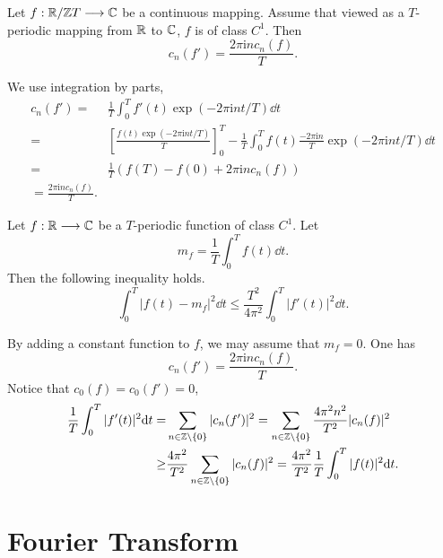 \begin{propositionenv}
    Let $f : \mathbb{R} /\mathbb{Z} T \longrightarrow \mathbb{C}$ be a continuous mapping.
    Assume that viewed as a $T$-periodic mapping from $\mathbb{R}$ to $\mathbb{C}$, $f$ is of class $C^1$.
    Then
    $$c_n(f') = \frac{2 \pi \mathrm{i} n c_{n}(f)}{T}.$$
\end{propositionenv}
\begin{proofenv}
    We use integration by parts,
    $$\begin{aligned}
        c_n(f') = & \frac{1}{T} \int_{0}^{T} f'(t) \exp(-2 \pi \mathrm{i} n t /T) \dd t\\
        = & \left[\frac{f(t) \exp(-2 \pi \mathrm{i} n t/T)}{T}\right]_{0}^{T} - \frac{1}{T} \int_{0}^{T} f(t) \frac{-2 \pi \mathrm{i} n}{T} \exp(- 2 \pi \mathrm{i} n t/T) \dd t\\
        = & \frac{1}{T} \left(f(T) - f(0) + 2 \pi \mathrm{i} n c_n (f)\right)\\
        = \frac{2 \pi \mathrm{i} n c_n(f)}{T}.
    \end{aligned}$$
\end{proofenv}

\begin{propositionenv}
    Let $f : \mathbb{R} \longrightarrow \mathbb{C}$ be a $T$-periodic function of class $C^1$.
    Let
    $$m_f = \frac{1}{T} \int_{0}^{T} f(t) \dd t.$$
    Then the following inequality holds.
    $$\int_{0}^{T} |f(t) - m_f|^2 \dd t \le \frac{T^2}{4 \pi^2} \int_{0}^{T} |f'(t)|^2 \dd t.$$
\end{propositionenv}
\begin{proofenv}
    By adding a constant function to $f$, we may assume that $m_f = 0$.
    One has
    $$c_n(f') = \frac{2 \pi \mathrm{i} n c_n(f)}{T}.$$
    Notice that $c_0(f) = c_0(f') = 0$,
    $$\begin{aligned}
        \frac{1}{T} \int_{0}^{T} |f'(t)|^2 \mathrm{d} t = & \sum_{n \in \mathbb{Z} \setminus \{0\}} |c_n(f')|^2 = \sum_{n \in \mathbb{Z} \setminus \{0\}} \frac{4 \pi^2 n^2}{T^2} |c_n (f)|^2\\
        \ge & \frac{4 \pi^2}{T^2} \sum_{n \in \mathbb{Z} \setminus \{0\}} |c_n(f)|^2 = \frac{4 \pi^2}{T^2} \frac{1}{T} \int_{0}^{T} |f(t)|^2 \mathrm{d} t.
    \end{aligned}$$
\end{proofenv}


\section{Fourier Transform}


